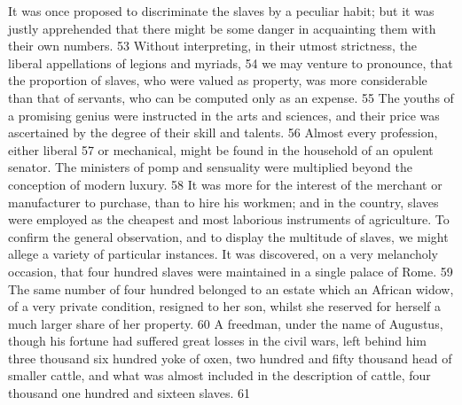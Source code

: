 It was once proposed to discriminate the slaves by a peculiar habit;
but it was justly apprehended that there might be some danger in
acquainting them with their own numbers. 53 Without interpreting,
in their utmost strictness, the liberal appellations of legions
and myriads, 54 we may venture to pronounce, that the proportion
of slaves, who were valued as property, was more considerable
than that of servants, who can be computed only as an expense. 55
The youths of a promising genius were instructed in the arts and
sciences, and their price was ascertained by the degree of their
skill and talents. 56 Almost every profession, either liberal 57
or mechanical, might be found in the household of an opulent
senator. The ministers of pomp and sensuality were multiplied
beyond the conception of modern luxury. 58 It was more for the
interest of the merchant or manufacturer to purchase, than to
hire his workmen; and in the country, slaves were employed as the
cheapest and most laborious instruments of agriculture. To
confirm the general observation, and to display the multitude of
slaves, we might allege a variety of particular instances. It was
discovered, on a very melancholy occasion, that four hundred
slaves were maintained in a single palace of Rome. 59 The same
number of four hundred belonged to an estate which an African
widow, of a very private condition, resigned to her son, whilst
she reserved for herself a much larger share of her property. 60
A freedman, under the name of Augustus, though his fortune had
suffered great losses in the civil wars, left behind him three
thousand six hundred yoke of oxen, two hundred and fifty thousand
head of smaller cattle, and what was almost included in the
description of cattle, four thousand one hundred and sixteen
slaves. 61





